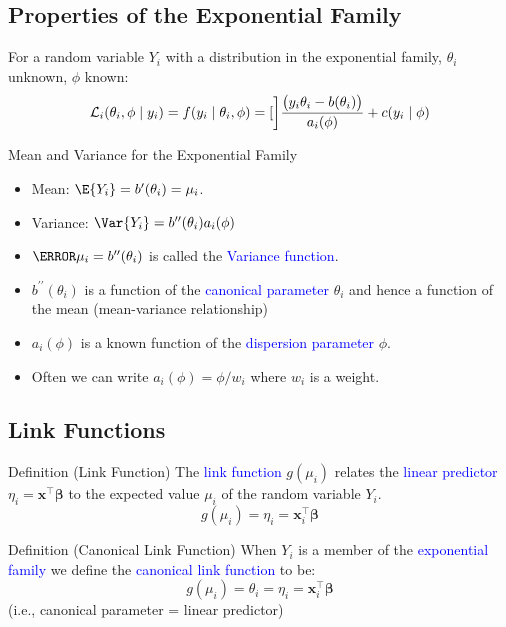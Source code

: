 \documentclass[oneside]{book}\usepackage[]{graphicx}\usepackage[svgnames]{xcolor}
\let\exp\relax%
\providecommand{\Vector}[1]{\bm{#1}}%
\begin{document}
\subsection*{Properties of the Exponential Family}
For a random variable $Y_i$ with a distribution in the exponential family, $ \theta_i $ unknown, $ \phi $
known:
\[ \mathcal{L}_i(\theta_i,\phi\mid y_i)=f(y_i\mid \theta_i,\phi)=\exp[\bigg]{\frac{\bigl(y_i\theta_i-b(\theta_i)\bigr)}{a_i(\phi)}+c(y_i\mid \phi)} \]
\begin{Regular}{Mean and Variance for the Exponential Family}
      \begin{itemize}
            \item Mean: $ \E{Y_i}=b^\prime(\theta_i)=\mu_i $.
            \item Variance: $ \Var{Y_i}=b^{\prime\prime}(\theta_i)a_i(\phi) $
      \end{itemize}
\end{Regular}
\begin{itemize}
      \item $ \V{\mu_i}=b^{\prime\prime}(\theta_i) $ is called the \textcolor{Blue}{Variance function}.
      \item $ b^{\prime\prime}(\theta_i) $ is a function of the \textcolor{Blue}{canonical parameter} $ \theta_i $ and hence a function of the mean
            (mean-variance relationship)
      \item $ a_i(\phi) $ is a known function of the \textcolor{Blue}{dispersion parameter} $ \phi $.
      \item Often we can write $ a_i(\phi)=\phi/w_i $ where $ w_i $ is a weight.
\end{itemize}
\subsection*{Link Functions}
\begin{Regular}{Definition (Link Function)}
      The \textcolor{Blue}{link function} $ g(\mu_i) $ relates the \textcolor{Blue}{linear predictor} $ \eta_i=\Vector{x}^\top\Vector{\beta} $ to the expected value $ \mu_i $ of the random variable $ Y_i $.
      \[ g(\mu_i)=\eta_i=\Vector{x}_i^\top\Vector{\beta} \]
\end{Regular}
\begin{Regular}{Definition (Canonical Link Function)}
      When $Y_i$ is a member of the \textcolor{Blue}{exponential family} we define the \textcolor{Blue}{canonical link function} to be:
      \[ g(\mu_i)=\theta_i=\eta_i=\Vector{x}_i^\top\Vector{\beta} \]
      (i.e., canonical parameter = linear predictor)
\end{Regular}
\end{document}
